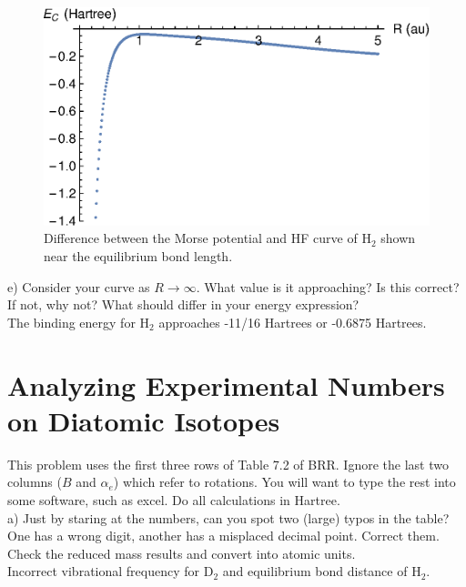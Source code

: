 \documentclass{article}
\begin{document}
\begin{figure}[H]
  \centering
  \includegraphics[scale=0.8]{diff_hfmorse.eps}
  \caption{Difference between the Morse potential and HF curve of H$_2$
    shown near the equilibrium bond length.}
\end{figure}

\noindent e) Consider your curve as $R\rightarrow\infty$. What value is it
approaching? Is this correct? If not, why not? What should differ in your energy
expression?
\\

{\color{blue}
  The binding energy for H$_2$ approaches -11/16 Hartrees or -0.6875 Hartrees.}

\pagebreak

\section*{Analyzing Experimental Numbers on Diatomic Isotopes}

This problem uses the first three rows of Table 7.2 of BRR.  Ignore the last two columns
($B$ and $\alpha_e$) which refer to rotations.  You will want to type the rest into
some software, such as excel.  Do all calculations in Hartree.
\\

\noindent a) Just by staring at the numbers, can you spot two (large) typos in the table? One has a
wrong digit, another has a misplaced decimal point. Correct them. Check the reduced mass
results and convert into atomic units.
\\

{\color{blue} Incorrect vibrational frequency for D$_2$ and equilibrium
  bond distance of H$_2$.
}
\\
\end{document}
